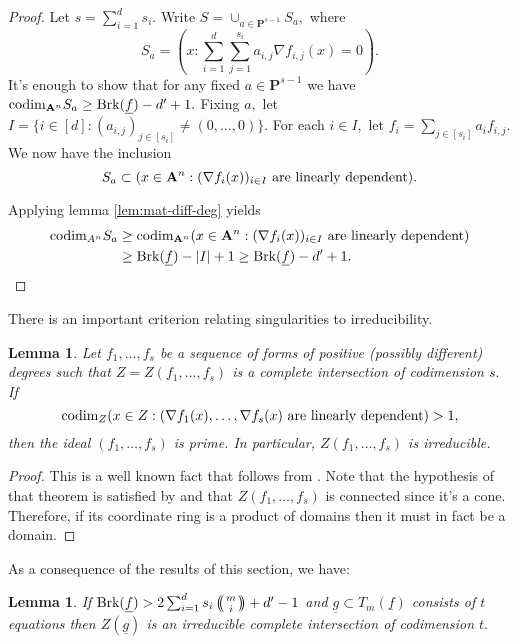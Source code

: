 \documentclass[12pt]{amsart}
\let\ul\underline
\newtheorem{lemma}[theorem]{Lemma}
\theoremstyle{definition}
\def\multiset#1#2{\ensuremath{\left(\kern-.3em\left(\genfrac{}{}{0pt}{}{#1}{#2}\right)\kern-.3em\right)}}
\newcommand{\A}{\mathbf{A}}
\renewcommand{\P}{\mathbf{P}}
\newcommand{\codim}{\textnormal{codim}}
\newcommand{\brk}{\textnormal{Brk}}
\let\ul\underline
\begin{document}
\begin{proof}
Let $s = \sum_{i=1}^d s_i.$ Write $S = \cup_{a\in \P^{s-1}} S_a,$ where 
\[
S_a =  \left(x: \sum_{i=1}^d\sum_{j=1}^{s_i} a_{i,j} \nabla f_{i,j}(x) = 0 \right).
\]
It's enough to show that for any fixed $a\in \P^{s-1}$ we have $\codim_{\A^n} S_a \ge \brk(\ul{f})-d'+1.$ Fixing $a,$ let $I = \{i\in [d]: (a_{i,j})_{j\in [s_i]} \neq (0,\ldots,0)\}.$ For each $i\in I,$ let $f_i = \sum_{j\in [s_i]} a_i f_{i,j}.$ We now have the inclusion 
\[
S_a \subset (x\in \A^n: (\nabla f_i(x))_{i\in I} \textnormal{ are linearly dependent}).
\]

Applying lemma \ref{lem:mat-diff-deg} yields
\begin{align*}
    \codim_{A^n} S_a &\ge \codim_{\A^n} (x\in \A^n: (\nabla f_i(x))_{i\in I} \textnormal{ are linearly dependent}) \\
    &\ge \brk(\ul{f}) - |I|+1 \ge \brk(\ul{f}) - d'+1. 
\end{align*}  
\end{proof}

There is an important criterion relating singularities to irreducibility.

\begin{lemma}\label{lem:R1-seq}
   Let $f_1,\ldots,f_s$ be a sequence of forms of positive (possibly different) degrees such that $ Z = Z(f_1,\ldots,f_s)$ is a complete intersection of codimension $s.$ If 
   \[
   \codim_Z (x\in Z: (\nabla f_1(x),\ldots,\nabla f_s(x) \textnormal{ are linearly dependent}) >1, 
   \]
   then the ideal $(f_1,\ldots,f_s)$ is prime. In particular, $Z(f_1,\ldots,f_s)$ is irreducible. 
\end{lemma}

\begin{proof}
    This is a well known fact that follows from \cite[Theorem 18.15b]{Eisenbud}. Note that the hypothesis of that theorem is satisfied by \cite[Proposition 18.13]{Eisenbud} and that $Z(f_1,\ldots,f_s)$ is connected since it's a cone. Therefore, if its coordinate ring is a product of domains then it must in fact be a domain.
\end{proof}

As a consequence of the results of this section, we have:

\begin{lemma}\label{lem:brk-irr}
    If $\brk(\ul{f}) > 2\sum_{i=1}^d s_i \multiset{m}{i}+d'-1$ and $\ul{g} \subset T_m(\ul{f})$ consists of $t$ equations then $Z(\ul{g})$ is an irreducible complete intersection of codimension $t.$
\end{lemma}
\end{document}
